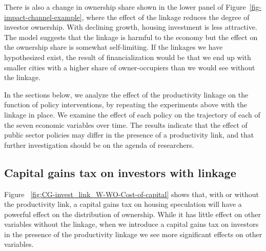 There is also a change in ownership share shown in the lower panel of Figure~\ref{fig-impact-channel-example}, where the effect of the linkage reduces the degree of investor ownership. With declining growth, housing investment is less attractive. The model suggests that the linkage is harmful to the economy but the effect on the ownership share is somewhat self-limiting.  If the linkages we have hypothesized exist, the result of financialization would be that we end up with smaller cities with a higher share of owner-occupiers than we would see without the linkage. %

In the sections below, we analyze the effect of the productivity linkage on the function of policy interventions, by repeating the experiments above with the linkage in place.  %
We examine the effect of each policy 
on the trajectory of each of the seven economic variables over time. The results indicate that the effect of public sector policies may differ in the presence of a productivity link, and that further investigation should be on the agenda of researchers. %


\newpage

\subsection{Capital gains tax on investors with linkage} \label{subsec:CGinvest}


Figure ~\ref{fig:CG-invest_link_W-WO-Cost-of-capital} shows that, with or without the productivity link, a capital gains tax on housing speculation will have a powerful effect on the distribution of ownership. While it has little effect on other variables without the linkage, when we introduce a capital gains tax on investors in the presence of the productivity linkage %
we see more significant effects on other variables.

